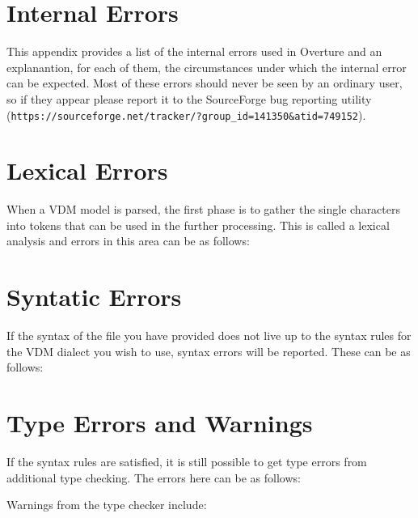 \documentclass{overturerepchap}
\newcommand{\url}[1]{\texttt{#1}}
\begin{document}
\newpage
\chapter{Internal Errors}\label{app:internalerrors}

This appendix provides a list of the internal errors used in Overture
and an explanantion, for each of them, the circumstances under which the
internal error can be expected. Most of these errors should
never be seen by an ordinary user, so if they appear please report it
to the SourceForge bug reporting utility
(\url{https://sourceforge.net/tracker/?group_id=141350&atid=749152}). 



\newpage
\chapter{Lexical Errors}\label{app:lexerr}

When a VDM model is parsed, the first phase is to gather the single
characters into tokens that can be used in the further
processing. This is called a lexical analysis and errors in this area
can be as follows:



\newpage
\chapter{Syntatic Errors}\label{app:synerr}

If the syntax of the file you have provided does not live up to the
syntax rules for the VDM dialect you wish to use, syntax errors will be
reported. These can be as follows:



\newpage
\chapter{Type Errors and Warnings}\label{app:typeerr}

If the syntax rules are satisfied, it is still possible to get type
errors from additional type checking. The errors here can be as
follows:



Warnings from the type checker include:


\end{document}
